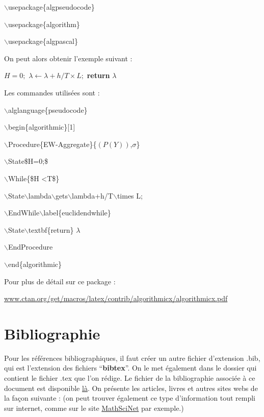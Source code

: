 \documentclass[11pt]{article}
\theoremstyle{remark}
\theoremstyle{definition}
\begin{document}
$\backslash$usepackage\{algpseudocode\}

$\backslash$usepackage\{algorithm\}

$\backslash$usepackage\{algpascal\} \medskip

On peut alors obtenir  l'exemple suivant :\medskip

\begin{algorithmic}[1]
\State $H=0;$
      \State$\lambda \gets \lambda+h/T \times L;$
	\EndWhile\label{euclidendwhile}
   \State \textbf{return} $\lambda$
\EndProcedure
\end{algorithmic}
\medskip
Les commandes utilisées sont :\medskip

$\backslash$alglanguage\{pseudocode\}

$\backslash$begin\{algorithmic\}[1]

$\backslash$Procedure\{EW-Aggregate\}\{$(P(Y))$,$\sigma$\}

$\backslash$State\$H=0;\$

$\backslash$While\{\$H <T\$\}

$\backslash$State$\backslash$lambda$\backslash$gets$\backslash$lambda+h/T$\backslash$times L;

$\backslash$EndWhile$\backslash$label\{euclidendwhile\}

$\backslash$State$\backslash$textbf\{return\} $\lambda$

$\backslash$EndProcedure

$\backslash$end\{algorithmic\} \medskip

\noindent Pour plus de détail sur ce package :\medskip

\noindent\url{www.ctan.org/get/macros/latex/contrib/algorithmicx/algorithmicx.pdf}


\section{Bibliographie}


Pour les références bibliographiques,  il faut créer un autre fichier d'extension .bib, qui est l'extension des fichiers ``\textbf{bibtex}''. On le met également dans le dossier qui contient le fichier .tex que l'on rédige. Le fichier de la bibliographie associée à ce document est disponible \href{http://people.math.jussieu.fr/~salmon/enseignement/M1/refs.bib}{là}.  On présente les articles, livres et autres sites webs de la façon suivante : (on peut trouver également ce type d'information tout rempli sur internet, comme sur le site \href{http://ams.u-strasbg.fr/mathscinet/}{MathSciNet} par exemple.)\medskip
\end{document}
